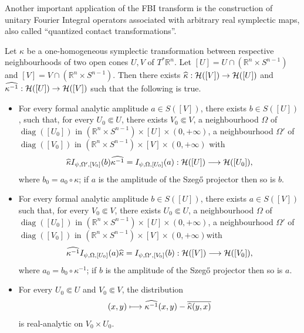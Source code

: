 \documentclass[AHL,Unicode,longabstracts,published]{cedram}
\DeclareMathOperator{\diag}{diag}
\newcommand{\clH}{\mathcal{H}}
\newcommand\1{\mathds{1}}
\newcommand{\R}{\mathbb{R}}
\let\oldhat\hat
\renewcommand*{\hat}[1]{\mathchoice{\widehat{#1}}{\widehat{#1}}{\oldhat{#1}}{\oldhat{#1}}}
\renewcommand*{\to}{\mathchoice{\longrightarrow}{\rightarrow}{\rightarrow}{\rightarrow}}
\let\oldmapsto\mapsto
\renewcommand*{\mapsto}{\mathchoice{\longmapsto}{\oldmapsto}{\oldmapsto}{\oldmapsto}}
\begin{document}
Another important application of the FBI transform is the construction of unitary Fourier {Integral} operators associated with arbitrary real symplectic maps, also called ``quantized contact transformations''.

\begin{prop}\label{prop:quantized-contact}
Let $\kappa$ be a one-homogeneous symplectic transformation between respective neighbourhoods of two open cones $U,V$ of $T^*\R^n$. Let $[U]=U\cap (\R^n\times S^{n-1})$ and $[V]=V\cap (\R^n\times S^{n-1})$. Then there exists $\hat{\kappa}:\clH([V])\to \clH([U])$ and $\widehat{\kappa^{-1}}:\clH([U])\to \clH([V])$ such that the following is true.
\begin{itemize}
\item\label{prop4.25.1} For every formal analytic amplitude $a\in S([V])$, there exists $b\in S([U])$, such that, for every $U_0\Subset U$, there exists $V_0\Subset V$, a neighbourhood $\Omega$ of $\diag([U_0])$ in $(\R^n\times S^{n-1})\times [U]\times (0,+\infty)$, a neighbourhood $\Omega'$ of $\diag([V_0])$ in $(\R^n\times S^{n-1})\times [V]\times (0,+\infty)$ with
\[
\hat{\kappa}I_{\psi,\Omega',[V_0]}(b)\widehat{\kappa^{-1}}=I_{\psi,\Omega,[U_0]}(a):\clH([U])\to \clH([U_0]),
\]
where $b_0=a_0\circ \kappa$; if $a$ is the amplitude of the Szeg\H{o} projector then so is $b$.
\item\label{prop4.25.2} For every formal analytic amplitude $b\in S([U])$, there exists $a\in S([V])$ such that, for every $V_0\Subset V$, there exists $U_0\Subset U$, a neighbourhood $\Omega$ of $\diag([U_0])$ in $(\R^n\times S^{n-1})\times [U]\times (0,+\infty)$, a neighbourhood $\Omega'$ of $\diag([V_0])$ in $(\R^n\times S^{n-1})\times [V]\times (0,+\infty)$with
\[
\widehat{\kappa^{-1}}I_{\psi,\Omega,[U_0]}(a)\hat{\kappa}=I_{\psi,\Omega',[V_0]}(b):\clH([V])\to \clH([V_0]),
\]
where $a_0=b_0\circ \kappa^{-1}$; if $b$ is the amplitude of the Szeg\H{o} projector then so is $a$.
\item\label{prop4.25.3} For every $U_0\Subset U$ and $V_0\Subset V$, the distribution
\[
(x,y)\mapsto
\widehat{\kappa^{-1}}(x,y)-\overline{\hat{\kappa}(y,x)}
\]
is real-analytic on $V_0\times U_0$.
\end{itemize}
\end{prop}
\end{document}
